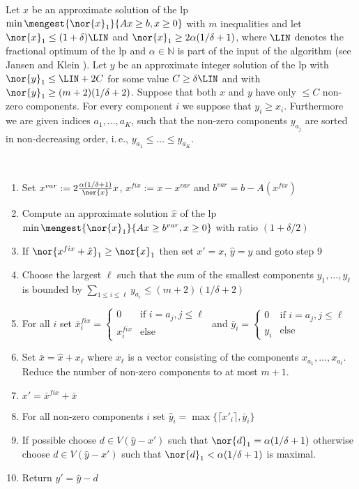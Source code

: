 Let $x$ be an approximate solution of the \ac{lp} $\min \mengest{\nor{x}_1}{Ax \geq b, x \geq 0 }$ with $m$ inequalities and let $\nor{x}_1 \leq (1+ \delta) \LIN$ and $\nor{x}_1 \geq 2 \alpha (1/ \delta +1)$, where $\LIN$ denotes the fractional optimum of the \ac{lp} and $\alpha\in \mathbb{N}$ is part of the input of the algorithm (see Jansen and Klein \cite{jansen2013binpacking}). 
Let $y$ be an approximate integer solution of the \ac{lp} with $\nor{y}_1 \leq \LIN +2C$ for some value 
$C \geq \delta \LIN$ and with $\nor{y}_1 \geq (m+2)(1/\delta +2)$. 
Suppose that both $x$ and $y$ have only $\leq C$ non-zero components. For every component $i$ we suppose that $y_i \geq x_i$. Furthermore we are given indices $a_1, \ldots ,a_K$, such that the non-zero components $y_{a_j}$ are sorted in non-decreasing order, i.\,e., $y_{a_1} \leq \ldots \leq y_{a_K}$.
\begin{algo}\label{improve}
\ 
  \begin{enumerate}
   \item Set $x^{var} := 2 \frac{ \alpha(1 / \delta +1)}{\nor{x}}x$, $x^{fix} := x - x^{var}$ and 
   $b^{var} = b - A(x^{fix})$
    \item Compute an approximate solution $\hat{x}$ of the \ac{lp} $\min \mengest{\nor{x}_1}{Ax \geq b^{var}, x\geq 0 }$
	with ratio $(1+ \delta/2)$
	\item If $\nor{x^{fix} + \hat{x}}_1 \geq \nor{x}_1$ then set $x' = x$, 
	$\hat{y} = y$ and goto step 9
  \item Choose the largest $\ell$ such that the sum of the smallest components $y_1, \ldots , y_{\ell}$ is bounded by
  $\sum_{1\leq i \leq \ell} y_{a_i} \leq (m+2)(1/ \delta +2)$
	\item For all $i $ set $\bar{x}^{fix}_{i} = 
	\begin{cases} 0 & \text{if }i= a_j, j \leq \ell \\
	x^{fix}_i & \text{else}
	\end{cases}$ 
	and $\bar{y}_i = \begin{cases} 0 & \text{if }i= a_j, j \leq \ell \\
	y_i & \text{else}
	\end{cases}$
	\item Set $\bar{x} = \hat{x} + x_{\ell}$ where $x_{\ell}$ is a
          vector consisting of the components 
	$x_{a_1}, \ldots ,x_{a_{\ell}}$. Reduce the number of non-zero components to at most $m+1$.
  \item $x' = \bar{x}^{fix} + \bar{x}$
  \item For all non-zero components $i$ set $\hat{y}_i = \max \{\lceil x'_i \rceil , \bar{y}_i \}$
	\item If possible choose $d \in V(\hat{y}-x')$ such that $\nor{d}_1 = \alpha (1/ \delta +1)$ otherwise
  choose $d \in V(\hat{y}-x')$ such that $\nor{d}_1 < \alpha (1/ \delta +1)$ is maximal.
  \item Return $y' = \hat{y} -d$
  \end{enumerate}
\end{algo}


